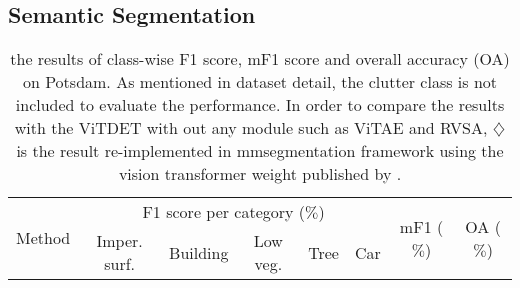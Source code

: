 \subsection{Semantic Segmentation}

\begin{table*}[t]{\textwidth=0mm}
    \centering
    \caption{the results of class-wise F1 score, mF1 score and overall accuracy (OA) on Potsdam. As mentioned in dataset detail, the clutter class is not included to evaluate the performance. In order to compare the results with the ViTDET with out any module such as ViTAE and RVSA, $\diamondsuit$ is the result re-implemented in mmsegmentation framework using the vision transformer weight published by \cite{wang2022advancing}.}
    \renewcommand{\arraystretch}{1.0}
    {
    \begin{tabular}{l|c c c c c | c | c}
    
        \hline
       
       
       \multirow{2}{*}{Method} & \multicolumn{5}{c|}{F1 score per category ($\%$)} & \multirow{2}{*}{mF1 ($\%$)} & \multirow{2}{*}{OA ($\%$)} \\ \cline{2-6}
        & Imper. surf. & Building & Low veg. & Tree & Car & &  \\ \hline


\end{tabular}}
\end{table*}
